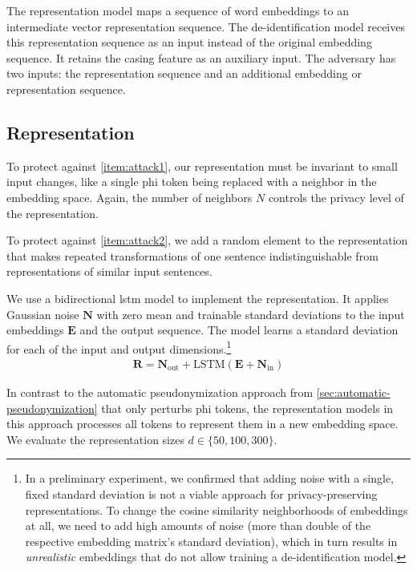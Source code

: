 %
The representation model maps a sequence of word embeddings to an intermediate vector representation sequence.
%
The de-identification model receives this representation sequence as an input instead of the original embedding sequence.
%
It retains the casing feature as an auxiliary input.
%
The adversary has two inputs: the representation sequence and an additional embedding or representation sequence.

\subsection{Representation}
%
To protect against \ref{item:attack1}, our representation must be invariant to small input changes, like a single \ac{phi} token being replaced with a neighbor in the embedding space.
%
Again, the number of neighbors $N$ controls the privacy level of the representation.

%
To protect against \ref{item:attack2}, we add a random element to the representation that makes repeated transformations of one sentence indistinguishable from representations of similar input sentences.

%
We use a bidirectional \ac{lstm} model to implement the representation.
%
It applies Gaussian noise $\bm{N}$ with zero mean and trainable standard deviations to the input embeddings $\bm{E}$ and the output sequence.
%
The model learns a standard deviation for each of the input and output dimensions.\footnote{
    In a preliminary experiment, we confirmed that adding noise with a single, fixed standard deviation is not a viable approach for privacy-preserving representations.
    To change the cosine similarity neighborhoods of embeddings at all, we need to add high amounts of noise (more than double of the respective embedding matrix's standard deviation), which in turn results in \emph{unrealistic} embeddings that do not allow training a de-identification model.
}
%
\begin{align}
\bm{R} = \bm{N}_{\text{out}} + \text{LSTM}(\bm{E} + \bm{N}_{\text{in}})
\end{align}

%
In contrast to the automatic pseudonymization approach from \cref{sec:automatic-pseudonymization} that only perturbs \ac{phi} tokens, the representation models in this approach processes all tokens to represent them in a new embedding space.
%
We evaluate the representation sizes $d \in \{50, 100, 300\}$. 

